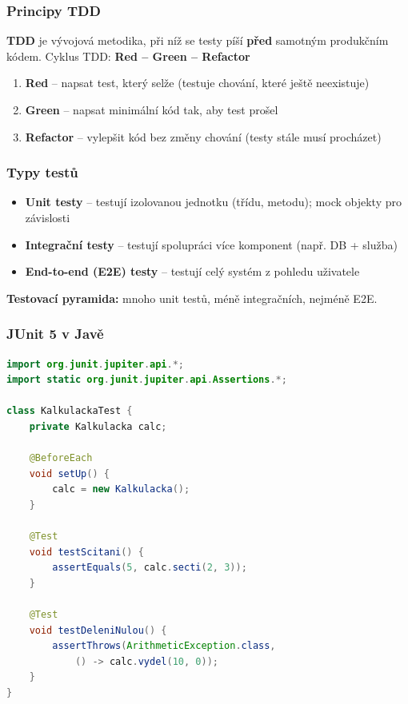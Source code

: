 \subsubsection{Principy TDD}

\textbf{TDD} je vývojová metodika, při níž se testy píší \textbf{před} samotným produkčním kódem.
Cyklus TDD: \textbf{Red -- Green -- Refactor}

\begin{enumerate}
  \item \textbf{Red} -- napsat test, který selže (testuje chování, které ještě neexistuje)
  \item \textbf{Green} -- napsat minimální kód tak, aby test prošel
  \item \textbf{Refactor} -- vylepšit kód bez změny chování (testy stále musí procházet)
\end{enumerate}

\subsubsection{Typy testů}

\begin{itemize}
  \item \textbf{Unit testy} -- testují izolovanou jednotku (třídu, metodu); mock objekty pro závislosti
  \item \textbf{Integrační testy} -- testují spolupráci více komponent (např. DB + služba)
  \item \textbf{End-to-end (E2E) testy} -- testují celý systém z pohledu uživatele
\end{itemize}

\textbf{Testovací pyramida:} mnoho unit testů, méně integračních, nejméně E2E.

\subsubsection{JUnit 5 v Javě}

\begin{lstlisting}[language=Java, caption=Unit test s JUnit 5]
import org.junit.jupiter.api.*;
import static org.junit.jupiter.api.Assertions.*;

class KalkulackaTest {
    private Kalkulacka calc;

    @BeforeEach
    void setUp() {
        calc = new Kalkulacka();
    }

    @Test
    void testScitani() {
        assertEquals(5, calc.secti(2, 3));
    }

    @Test
    void testDeleniNulou() {
        assertThrows(ArithmeticException.class,
            () -> calc.vydel(10, 0));
    }
}
\end{lstlisting}

